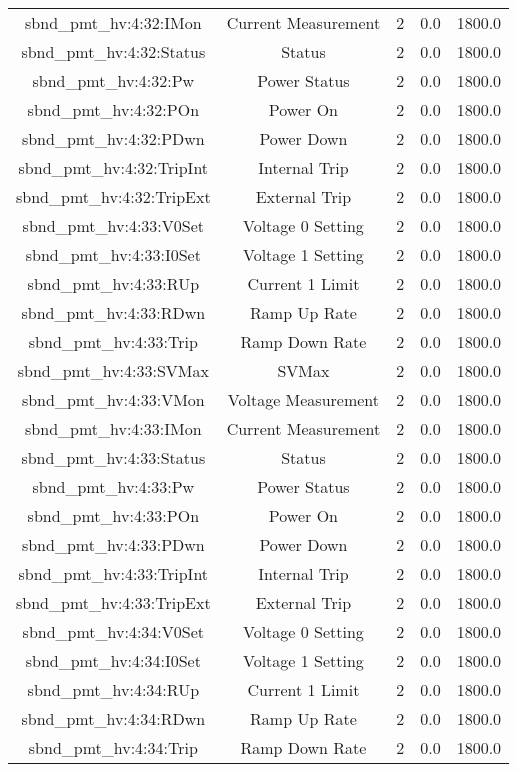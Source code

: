 \begin{table}[ptb]
\begin{tabular}{c | c c c c}
sbnd_pmt_hv:4:32:IMon & Current Measurement & 2 & 0.0 & 1800.0\\ 
sbnd_pmt_hv:4:32:Status & Status & 2 & 0.0 & 1800.0\\ 
sbnd_pmt_hv:4:32:Pw & Power Status & 2 & 0.0 & 1800.0\\ 
sbnd_pmt_hv:4:32:POn & Power On & 2 & 0.0 & 1800.0\\ 
sbnd_pmt_hv:4:32:PDwn & Power Down & 2 & 0.0 & 1800.0\\ 
sbnd_pmt_hv:4:32:TripInt & Internal Trip & 2 & 0.0 & 1800.0\\ 
sbnd_pmt_hv:4:32:TripExt & External Trip & 2 & 0.0 & 1800.0\\ 
sbnd_pmt_hv:4:33:V0Set & Voltage 0 Setting & 2 & 0.0 & 1800.0\\ 
sbnd_pmt_hv:4:33:I0Set & Voltage 1 Setting & 2 & 0.0 & 1800.0\\ 
sbnd_pmt_hv:4:33:RUp & Current 1 Limit & 2 & 0.0 & 1800.0\\ 
sbnd_pmt_hv:4:33:RDwn & Ramp Up Rate & 2 & 0.0 & 1800.0\\ 
sbnd_pmt_hv:4:33:Trip & Ramp Down Rate & 2 & 0.0 & 1800.0\\ 
sbnd_pmt_hv:4:33:SVMax & SVMax & 2 & 0.0 & 1800.0\\ 
sbnd_pmt_hv:4:33:VMon & Voltage Measurement & 2 & 0.0 & 1800.0\\ 
sbnd_pmt_hv:4:33:IMon & Current Measurement & 2 & 0.0 & 1800.0\\ 
sbnd_pmt_hv:4:33:Status & Status & 2 & 0.0 & 1800.0\\ 
sbnd_pmt_hv:4:33:Pw & Power Status & 2 & 0.0 & 1800.0\\ 
sbnd_pmt_hv:4:33:POn & Power On & 2 & 0.0 & 1800.0\\ 
sbnd_pmt_hv:4:33:PDwn & Power Down & 2 & 0.0 & 1800.0\\ 
sbnd_pmt_hv:4:33:TripInt & Internal Trip & 2 & 0.0 & 1800.0\\ 
sbnd_pmt_hv:4:33:TripExt & External Trip & 2 & 0.0 & 1800.0\\ 
sbnd_pmt_hv:4:34:V0Set & Voltage 0 Setting & 2 & 0.0 & 1800.0\\ 
sbnd_pmt_hv:4:34:I0Set & Voltage 1 Setting & 2 & 0.0 & 1800.0\\ 
sbnd_pmt_hv:4:34:RUp & Current 1 Limit & 2 & 0.0 & 1800.0\\ 
sbnd_pmt_hv:4:34:RDwn & Ramp Up Rate & 2 & 0.0 & 1800.0\\ 
sbnd_pmt_hv:4:34:Trip & Ramp Down Rate & 2 & 0.0 & 1800.0\\ 

\end{tabular}
\end{table}
